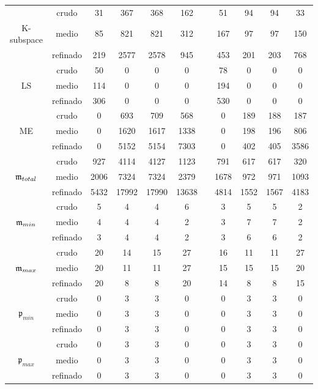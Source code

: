 \begin{table}[htb]
\begin{adjustbox}{width=0.95\columnwidth,center}
\begin{tabular}{ccccccccccc}
			\hline
			& crudo & 31 & 367 & 368 & 162 &  & 51 & 94 & 94 & 33 \\
			K-subspace & medio & 85 & 821 & 821 & 312 &  & 167 & 97 & 97 & 150 \\
			& refinado & 219 & 2577 & 2578 & 945 &  & 453 & 201 & 203 & 768 \\
			\hline
			& crudo & 50 & 0 & 0 & 0 &  & 78 & 0 & 0 & 0 \\
			LS & medio & 114 & 0 & 0 & 0 &  & 194 & 0 & 0 & 0 \\
			& refinado & 306 & 0 & 0 & 0 &  & 530 & 0 & 0 & 0 \\
			\hline
			& crudo & 0 & 693 & 709 & 568 &  & 0 & 189 & 188 & 187 \\
			ME & medio & 0 & 1620 & 1617 & 1338 &  & 0 & 198 & 196 & 806 \\
			& refinado & 0 & 5152 & 5154 & 7303 &  & 0 & 402 & 405 & 3586 \\
			\hline
			& crudo & 927 & 4114 & 4127 & 1123 &  & 791 & 617 & 617 & 320 \\
			$\mathfrak{m}_{total}$ & medio & 2006 & 7324 & 7324 & 2379 &  & 1678 & 972 & 971 & 1093 \\
			& refinado & 5432 & 17992 & 17990 & 13638 &  & 4814 & 1552 & 1567 & 4183 \\
			\hline
			& crudo & 5 & 4 & 4 & 6 &  & 3 & 5 & 5 & 2 \\
			$\mathfrak{m}_{min}$ & medio & 4 & 4 & 4 & 2 &  & 3 & 7 & 7 & 2 \\
			& refinado & 3 & 4 & 4 & 2 &  & 3 & 6 & 6 & 2 \\
			\hline
			& crudo & 20 & 14 & 15 & 27 &  & 16 & 11 & 11 & 27 \\
			$\mathfrak{m}_{max}$ & medio & 20 & 11 & 11 & 27 &  & 15 & 15 & 15 & 20 \\
			& refinado & 20 & 8 & 8 & 20 &  & 14 & 8 & 8 & 15 \\
			\hline
			& crudo & 0 & 3 & 3 & 0 &  & 0 & 3 & 3 & 0 \\
			$\mathfrak{p}_{min}$ & medio & 0 & 3 & 3 & 0 &  & 0 & 3 & 3 & 0 \\
			& refinado & 0 & 3 & 3 & 0 &  & 0 & 3 & 3 & 0 \\
			\hline
			& crudo & 0 & 3 & 3 & 0 &  & 0 & 3 & 3 & 0 \\
			$\mathfrak{p}_{max}$ & medio & 0 & 3 & 3 & 0 &  & 0 & 3 & 3 & 0 \\
			& refinado & 0 & 3 & 3 & 0 &  & 0 & 3 & 3 & 0 \\
			\hline
		\end{tabular}
	\end{adjustbox}
\end{table}

